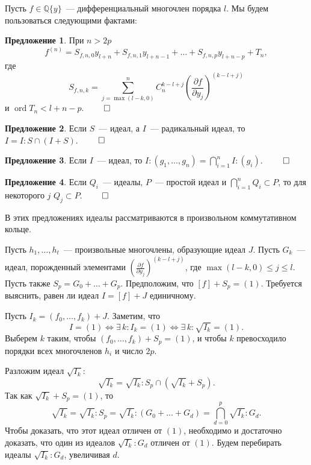 \documentclass[a4paper,12pt,russian]{amsart}
\DeclareMathOperator{\ord}{ord}
\renewcommand{\le}{\leqslant}
\theoremstyle{definition}
\newtheorem{proposition}{Предложение}
\begin{document}
Пусть $f \in \mathbb{Q}\{y\}$~--- дифференциальный многочлен порядка $l$.
Мы будем пользоваться следующими фактами:

\begin{proposition}
При $n > 2p$
$$
 f^{(n)} = S_{f,n,0} y_{l+n} + S_{f,n,1} y_{l+n-1} + \ldots + S_{f,n,p} y_{l+n-p} + T_n,
$$
где
$$
 S_{f,n,k} = \sum_{j=\max(l-k,0)}^n C_{n}^{k-l+j} \left(\frac{\partial f}{\partial y_{j}}\right)^{(k-l+j)}
$$
и $\ord T_n < l+n-p$. $\qed$
\end{proposition}

\begin{proposition}
Если $S$~--- идеал, а $I$~--- радикальный идеал, то $I = I:S \cap (I+S)$. $\qed$
\end{proposition}

\begin{proposition}
Если $I$~--- идеал, то $I : (g_1, \ldots, g_n) = \bigcap_{i=1}^n I:(g_i)$. $\qed$
\end{proposition}

\begin{proposition}
\label{Primes}
Если $Q_i$~--- идеалы, $P$~--- простой идеал и $\bigcap_{i=1}^n Q_i \subset P$, то для некоторого $j$ $Q_j \subset P$. $\qed$
\end{proposition}

В этих предложениях идеалы рассматриваются в произвольном коммутативном кольце.

\bigskip

Пусть $h_1, \ldots, h_t$~--- произвольные многочлены, образующие идеал $J$.
Пусть $G_k$~--- идеал, порожденный элементами $\left(\frac{\partial f}{\partial y_j}\right)^{(k-l+j)}$, где $\max(l-k, 0) \le j \le l$.
Пусть также $S_p = G_0 + \ldots + G_p$.
Предположим, что $[f] + S_p = (1)$.
Требуется выяснить, равен ли идеал $I = [f] + J$ единичному.

\bigskip



\bigskip


Пусть $I_k = (f_0, \ldots, f_k) + J$. Заметим, что 
$$
 I = (1) \iff \exists \, k: I_k = (1) \iff \exists \, k: \sqrt{I_k} = (1).
$$
Выберем $k$ таким, чтобы $(f_0, \ldots, f_k) + S_p = (1)$, и чтобы $k$ превосходило порядки всех многочленов $h_i$ и число $2p$.

Разложим идеал $\sqrt{I_k}$:
$$
 \sqrt{I_k} = \sqrt{I_k} : S_p  \cap  \left(\sqrt{I_k} + S_p\right).
$$
Так как $\sqrt{I_k} + S_p = (1)$, то
$$
 \sqrt{I_k} = \sqrt{I_k} : S_p = \sqrt{I_k} : (G_0 + \ldots + G_d) = \bigcap\limits_{d = 0}^p \sqrt{I_k} : G_d.
$$
Чтобы доказать, что этот идеал отличен от $(1)$, необходимо и достаточно доказать, что один из идеалов $\sqrt{I_k}:G_d$ отличен от $(1)$.
Будем перебирать идеалы $\sqrt{I_k} : G_d$, увеличивая $d$.
\end{document}

